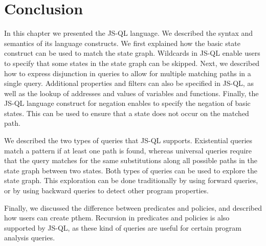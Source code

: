 \section{Conclusion}
In this chapter we presented the JS-QL language. We described the syntax and semantics of its language constructs. We first explained how the basic state construct can be used to match the state graph. Wildcards in JS-QL enable users to specify that some states in the state graph can be skipped. Next, we described how to express disjunction in queries to allow for multiple matching paths in a single query. Additional properties and filters can also be specified in JS-QL, as well as the lookup of addresses and values of variables and functions. Finally, the JS-QL language construct for negation enables to specify the negation of basic states. This can be used to ensure that a state does not occur on the matched path.

We described the two types of queries that JS-QL supports. Existential queries match a pattern if at least one path is found, whereas universal queries require that the query matches for the same substitutions along all possible paths in the state graph between two states. Both types of queries can be used to explore the state graph. This exploration can be done traditionally by using forward queries, or by using backward queries to detect other program properties.

 Finally, we discussed the difference between predicates and policies, and described how users can create pthem. Recursion in predicates and policies is also supported by JS-QL, as these kind of queries are useful for certain program analysis queries.




